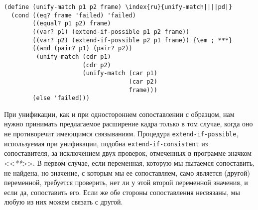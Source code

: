 \begin{Verbatim}[fontsize=\small]
(define (unify-match p1 p2 frame) \index{ru}{unify-match||||pd|}
  (cond ((eq? frame 'failed) 'failed)
        ((equal? p1 p2) frame)
        ((var? p1) (extend-if-possible p1 p2 frame))
        ((var? p2) (extend-if-possible p2 p1 frame)) {\em ; ***}
        ((and (pair? p1) (pair? p2))
         (unify-match (cdr p1)
                      (cdr p2)
                      (unify-match (car p1)
                                   (car p2)
                                   frame)))
        (else 'failed)))
\end{Verbatim}

При унификации, как и при одностороннем сопоставлении с
образцом, нам нужно принимать предлагаемое расширение кадра только в
том случае, когда оно не противоречит имеющимся связываниям.
Процедура {\tt extend-if-pos\-sible}, используемая при
унификации, подобна {\tt extend-if-consistent} из
сопоставителя, за исключением двух проверок, отмеченных в программе
значком <<{\em ***}>>.  В первом случае, если переменная,
которую мы пытаемся сопоставить, не найдена, но значение, с которым мы
ее сопоставляем, само является (другой) переменной, требуется
проверить, нет ли у этой второй переменной значения, и если да,
сопоставить его.  Если же обе стороны сопоставления несвязаны, мы любую
из них можем связать с другой.

